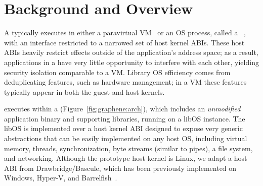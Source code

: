 \section{Background and Overview}
\label{sec:graphene:background}

A \libos{} typically executes in either a paravirtual VM~\citep{unikernels,osv}
or an OS process, called a {\em \picoproc{}}~\citep{porter11drawbridge,baumann13bascule},
with an interface restricted to a narrowed set of host kernel ABIs.
These host ABIs heavily restrict effects outside of the application's address space;
as a result, applications in a \picoproc{} have very little opportunity to interfere with each other,
yielding security isolation comparable to a VM.
Library OS efficiency comes from deduplicating features, such as hardware management;
in a VM these features typically appear in both the guest and host kernels.


\sysname{} executes within a \picoproc{} (Figure~\ref{fig:graphene:arch}),
which includes an {\em unmodified} application binary and supporting libraries, 
running on a libOS instance.
The libOS is implemented over a host kernel ABI
designed to expose very generic abstractions that can be easily 
implemented on any host OS, including virtual memory, threads, synchronization, byte streams (similar to pipes),
a file system, and networking.
Although the \sysname{} prototype  host kernel is Linux, 
we adapt a host ABI from Drawbridge/Bascule,
which has been previously implemented on Windows, Hyper-V, and Barrelfish~\citep{porter11drawbridge,baumann13bascule,baumann09barrelfish}.


